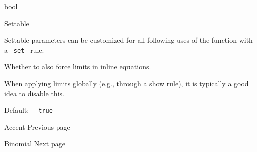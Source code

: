 \href{/docs/reference/foundations/bool/}{bool}

{{ Settable }}

\label{functions-limits-inline-settable-tooltip}
Settable parameters can be customized for all following uses of the
function with a \texttt{\ set\ } rule.

Whether to also force limits in inline equations.

When applying limits globally (e.g., through a show rule), it is
typically a good idea to disable this.

Default: \texttt{\ }{\texttt{\ true\ }}\texttt{\ }

\href{/docs/reference/math/accent/}{\pandocbounded{}}

{ Accent } { Previous page }

\href{/docs/reference/math/binom/}{\pandocbounded{}}

{ Binomial } { Next page }
